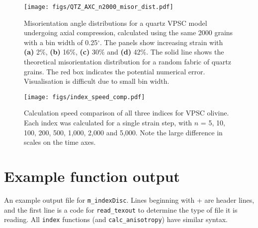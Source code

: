 \documentclass[a4paper,12pt,twoside]{report}
\numberwithin{equation}{chapter}
\begin{document}
\begin{figure}[h!]
  \centering
    \texttt{[image: figs/QTZ\_AXC\_n2000\_misor\_dist.pdf]}
  \caption[Misorientation angle distribution (quartz VPSC, higher resolution)]{Misorientation angle distributions for a quartz VPSC model undergoing axial compression, calculated using the same 2000 grains with a bin width of 0.25$^{\circ}$. The panels show increasing strain with \textbf{(a)} 2\%, \textbf{(b)} 16\%, \textbf{(c)} 30\% and \textbf{(d)} 42\%. The solid line shows the theoretical misorientation distribution for a random fabric of quartz grains. The red box indicates the potential numerical error. Visualisation is difficult due to small bin width.} 
  \label{fig:app:quartz_VPSC_anomaly}
\end{figure} 


\clearpage
\begin{figure}[h!]
  \centering
    \texttt{[image: figs/index\_speed\_comp.pdf]}
  \caption[Index speed comparison]{Calculation speed comparison of all three indices for VPSC olivine. Each index was calculated for a single strain step, with $n$ = 5, 10, 100, 200, 500, 1,000, 2,000 and 5,000. Note the large difference in scales on the time axes.} 
  \label{fig:app:index_speed}
\end{figure} 

\clearpage
\section{Example function output} \label{App:example_output}
An example output file for \texttt{m\_{}indexDisc}. Lines beginning with + are header lines, and the first line is a code for \texttt{read\_{}texout} to determine the type of file it is reading. All \texttt{index} functions (and \texttt{calc\_{}anisotropy}) have similar syntax. 
\end{document}
